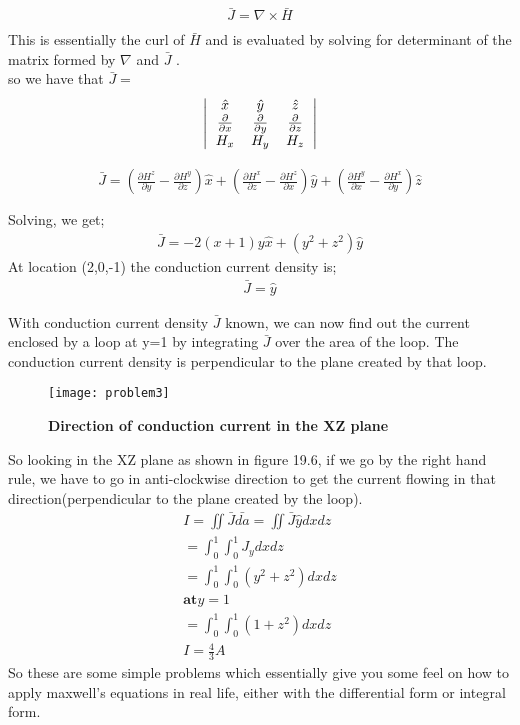    \begin{align*}
   \bar{J}=\nabla\times\bar{H}\\
    \end{align*}
    This is essentially the curl of $\bar{H}$ and is evaluated by solving for determinant of the matrix formed by $\nabla$ and $\bar{J}$ .\\
     so we have that $\bar{J} =$
    \[
    \left|
    \begin{tabular}{c c c}
    $\hat{x}$ & $\hat{y}$ & $\hat{z}$\\
    $\frac{\partial}{\partial x}$ &  $\frac{\partial}{\partial y}$ &  $\frac{\partial}{\partial z}$\\
    $H_{x}$ & $H_{y}$ & $H_{z}$
    \end{tabular}
    \right|
    \]
    
   \begin{align*}
  \bar{J}= (\frac{\partial H^{z}}{\partial y}-\frac{\partial H^{y}}{\partial z})\hat{x}+ (\frac{\partial H^{x}}{\partial z}-\frac{\partial H^{z}}{\partial x})\hat{y}+ (\frac{\partial H^{y}}{\partial x}-\frac{\partial H^{x}}{\partial y})\hat{z}\\\\
  \end{align*}
  Solving, we get;
   \begin{align*}
   \bar{J}=-2(x+1)y\hat{x}+(y^{2}+z^{2})\hat{y}
   \end{align*}
   At location (2,0,-1) the conduction current density is;
   \begin{align*}
   \bar{J}=\hat{y}
   \end{align*}
   
   With conduction current density $\bar{J}$ known, we can now find out the current enclosed by a loop at y=1 by integrating $\bar{J}$ over the area of the loop. The conduction current density is perpendicular to the plane created by that loop.
   
   \begin{figure}[h!]
   	\centering
   	\texttt{[image: problem3]}
   	\caption{\textbf{Direction of conduction current in the XZ plane}}
   \end{figure} 
So looking in the XZ plane as shown in figure 19.6, if we go by the right hand rule, we have to go in anti-clockwise direction to get the current flowing in that direction(perpendicular to the plane created by the loop).
\begin{align*}
I=\iint\bar{J}\bar{da}=\iint\bar{J}\hat{y}dxdz\\
=\int_{0}^{1}\int_{0}^{1}J_{y}dxdz \\
=\int_{0}^{1}\int_{0}^{1}(y^{2}+z^{2})dxdz\\
\textbf{at} y=1\\
=\int_{0}^{1}\int_{0}^{1}(1+z^{2})dxdz\\
I= \frac{4}{3}A
\end{align*}
So these are some simple problems which essentially give you some feel on how to apply maxwell's equations in real life, either with the differential form or integral form.